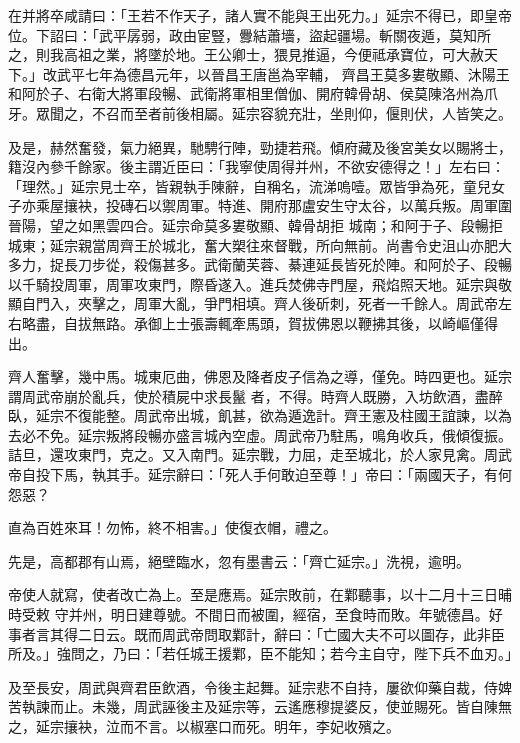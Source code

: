 \begin{pinyinscope}
 在并將卒咸請曰：「王若不作天子，諸人實不能與王出死力。」延宗不得已，即皇帝位。下詔曰：「武平孱弱，政由宦豎，釁結蕭墻，盜起疆場。斬關夜遁，莫知所之，則我高祖之業，將墜於地。王公卿士，猥見推逼，今便祗承寶位，可大赦天下。」改武平七年為德昌元年，以晉昌王唐邕為宰輔，
 齊昌王莫多婁敬顯、沐陽王和阿於子、右衛大將軍段暢、武衛將軍相里僧伽、開府韓骨胡、侯莫陳洛州為爪牙。眾聞之，不召而至者前後相屬。延宗容貌充壯，坐則仰，偃則伏，人皆笑之。



 及是，赫然奮發，氣力絕異，馳騁行陣，勁捷若飛。傾府藏及後宮美女以賜將士，籍沒內參千餘家。後主謂近臣曰：「我寧使周得并州，不欲安德得之！」左右曰：「理然。」延宗見士卒，皆親執手陳辭，自稱名，流涕嗚噎。眾皆爭為死，童兒女子亦乘屋攘袂，投磚石以禦周軍。特進、開府那盧安生守太谷，以萬兵叛。周軍圍晉陽，望之如黑雲四合。延宗命莫多婁敬顯、韓骨胡拒
 城南；和阿于子、段暢拒城東；延宗親當周齊王於城北，奮大槊往來督戰，所向無前。尚書令史沮山亦肥大多力，捉長刀步從，殺傷甚多。武衛蘭芙蓉、綦連延長皆死於陣。和阿於子、段暢以千騎投周軍，周軍攻東門，際昏遂入。進兵焚佛寺門屋，飛焰照天地。延宗與敬顯自門入，夾擊之，周軍大亂，爭門相填。齊人後斫刺，死者一千餘人。周武帝左右略盡，自拔無路。承御上士張壽輒牽馬頭，賀拔佛恩以鞭拂其後，以崎嶇僅得出。



 齊人奮擊，幾中馬。城東厄曲，佛恩及降者皮子信為之導，僅免。時四更也。延宗謂周武帝崩於亂兵，使於積屍中求長鬣
 者，不得。時齊人既勝，入坊飲酒，盡醉臥，延宗不復能整。周武帝出城，飢甚，欲為遁逸計。齊王憲及柱國王誼諫，以為去必不免。延宗叛將段暢亦盛言城內空虛。周武帝乃駐馬，鳴角收兵，俄傾復振。詰旦，還攻東門，克之。又入南門。延宗戰，力屈，走至城北，於人家見禽。周武帝自投下馬，執其手。延宗辭曰：「死人手何敢迫至尊！」帝曰：「兩國天子，有何怨惡？



 直為百姓來耳！勿怖，終不相害。」使復衣帽，禮之。



 先是，高都郡有山焉，絕壁臨水，忽有墨書云：「齊亡延宗。」洗視，逾明。



 帝使人就寫，使者改亡為上。至是應焉。延宗敗前，在鄴聽事，以十二月十三日晡時受敕
 守并州，明日建尊號。不間日而被圍，經宿，至食時而敗。年號德昌。好事者言其得二日云。既而周武帝問取鄴計，辭曰：「亡國大夫不可以圖存，此非臣所及。」強問之，乃曰：「若任城王援鄴，臣不能知；若今主自守，陛下兵不血刃。」



 及至長安，周武與齊君臣飲酒，令後主起舞。延宗悲不自持，屢欲仰藥自裁，侍婢苦執諫而止。未幾，周武誣後主及延宗等，云遙應穆提婆反，使並賜死。皆自陳無之，延宗攘袂，泣而不言。以椒塞口而死。明年，李妃收殯之。




\end{pinyinscope}
